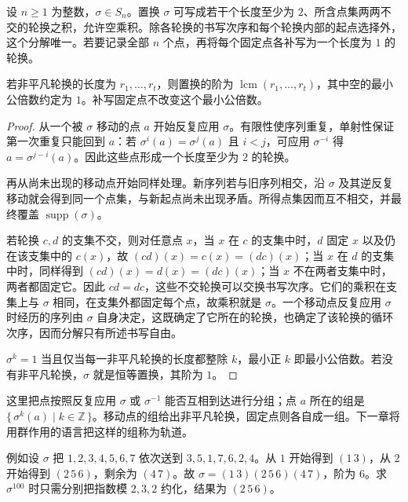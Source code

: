 \begin{theorem}[不交轮换分解]\label{b1:thm:cycle-decomposition}
	设 \(n\geq1\) 为整数，\(\sigma\in S_n\)。置换 \(\sigma\) 可写成若干个长度至少为 \(2\)、所含点集两两不交的轮换之积，允许空乘积。除各轮换的书写次序和每个轮换内部的起点选择外，这个分解唯一。若要记录全部 \(n\) 个点，再将每个固定点各补写为一个长度为 \(1\) 的轮换。

	若非平凡轮换的长度为 \(r_1,\ldots,r_t\)，则置换的阶为 \(\operatorname{lcm}(r_1,\ldots,r_t)\)，其中空的最小公倍数约定为 \(1\)。补写固定点不改变这个最小公倍数。
\end{theorem}
\begin{proof}
	从一个被 \(\sigma\) 移动的点 \(a\) 开始反复应用 \(\sigma\)。有限性使序列重复，单射性保证第一次重复只能回到 \(a\)：若 \(\sigma^i(a)=\sigma^j(a)\) 且 \(i<j\)，可应用 \(\sigma^{-i}\) 得 \(a=\sigma^{j-i}(a)\)。因此这些点形成一个长度至少为 \(2\) 的轮换。

	再从尚未出现的移动点开始同样处理。新序列若与旧序列相交，沿 \(\sigma\) 及其逆反复移动就会得到同一个点集，与新起点尚未出现矛盾。所得点集因而互不相交，并最终覆盖 \(\operatorname{supp}(\sigma)\)。

	若轮换 \(c,d\) 的支集不交，则对任意点 \(x\)，当 \(x\) 在 \(c\) 的支集中时，\(d\) 固定 \(x\) 以及仍在该支集中的 \(c(x)\)，故 \((cd)(x)=c(x)=(dc)(x)\)；当 \(x\) 在 \(d\) 的支集中时，同样得到 \((cd)(x)=d(x)=(dc)(x)\)；当 \(x\) 不在两者支集中时，两者都固定它。因此 \(cd=dc\)，这些不交轮换可以交换书写次序。它们的乘积在支集上与 \(\sigma\) 相同，在支集外都固定每个点，故乘积就是 \(\sigma\)。一个移动点反复应用 \(\sigma\) 时经历的序列由 \(\sigma\) 自身决定，这既确定了它所在的轮换，也确定了该轮换的循环次序，因而分解只有所述书写自由。

	\(\sigma^k=1\) 当且仅当每一非平凡轮换的长度都整除 \(k\)，最小正 \(k\) 即最小公倍数。若没有非平凡轮换，\(\sigma\) 就是恒等置换，其阶为 \(1\)。
\end{proof}

这里把点按照反复应用 \(\sigma\) 或 \(\sigma^{-1}\) 能否互相到达进行分组；点 \(a\) 所在的组是 \(\{\,\sigma^k(a)\mid k\in\mathbb Z\,\}\)。移动点的组给出非平凡轮换，固定点则各自成一组。下一章将用群作用的语言把这样的组称为轨道。

\ProseParagraphBreak
例如设 \(\sigma\) 把 \(1,2,3,4,5,6,7\) 依次送到 \(3,5,1,7,6,2,4\)。从 \(1\) 开始得到 \((1\,3)\)，从 \(2\) 开始得到 \((2\,5\,6)\)，剩余为 \((4\,7)\)。故 \(\sigma=(1\,3)(2\,5\,6)(4\,7)\)，阶为 \(6\)。求 \(\sigma^{100}\) 时只需分别把指数模 \(2,3,2\) 约化，结果为 \((2\,5\,6)\)。

